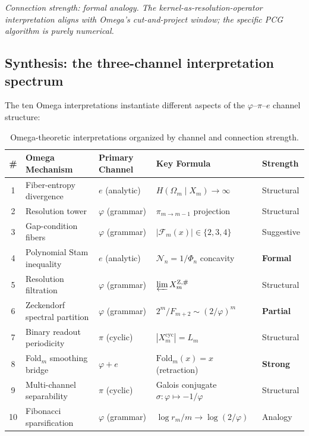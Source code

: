\begin{remark}
\emph{Connection strength: formal analogy.
The kernel-as-resolution-operator interpretation aligns with Omega's
cut-and-project window; the specific PCG algorithm is purely numerical.}
\end{remark}


\subsection{Synthesis: the three-channel interpretation spectrum}

The ten Omega interpretations instantiate different aspects of the
$\varphi$--$\pi$--$e$ channel structure:

\begin{table}[ht]
\centering
\caption{Omega-theoretic interpretations organized by channel and
connection strength.}
\label{tab:omega-interp}
\smallskip
\begin{tabular}{@{}cllll@{}}
\toprule
\textbf{\#} & \textbf{Omega Mechanism} & \textbf{Primary Channel}
  & \textbf{Key Formula} & \textbf{Strength} \\
\midrule
1 & Fiber-entropy divergence   & $e$ (analytic)
  & $H(\Omega_m\mid X_m)\to\infty$        & Structural \\
2 & Resolution tower           & $\varphi$ (grammar)
  & $\pi_{m\to m-1}$ projection            & Structural \\
3 & Gap-condition fibers       & $\varphi$ (grammar)
  & $|\mathcal F_m(x)|\in\{2,3,4\}$       & Suggestive \\
4 & Polynomial Stam inequality & $e$ (analytic)
  & $\mathcal N_n=1/\Phi_n$ concavity      & \textbf{Formal} \\
5 & Resolution filtration      & $\varphi$ (grammar)
  & $\varprojlim X_m^{\mathrm Z,\#}$      & Structural \\
6 & Zeckendorf spectral partition & $\varphi$ (grammar)
  & $2^m/F_{m+2}\sim(2/\varphi)^m$        & \textbf{Partial} \\
7 & Binary readout periodicity  & $\pi$ (cyclic)
  & $|X_m^{\mathrm{cyc}}|=L_m$            & Structural \\
8 & Fold$_m$ smoothing bridge   & $\varphi{+}e$
  & $\mathrm{Fold}_m(x)=x$ (retraction)   & \textbf{Strong} \\
9 & Multi-channel separability  & $\pi$ (cyclic)
  & Galois conjugate $\sigma:\varphi\mapsto-1/\varphi$ & Structural \\
10& Fibonacci sparsification   & $\varphi$ (grammar)
  & $\log r_m/m\to\log(2/\varphi)$        & Analogy \\
\bottomrule
\end{tabular}
\end{table}

